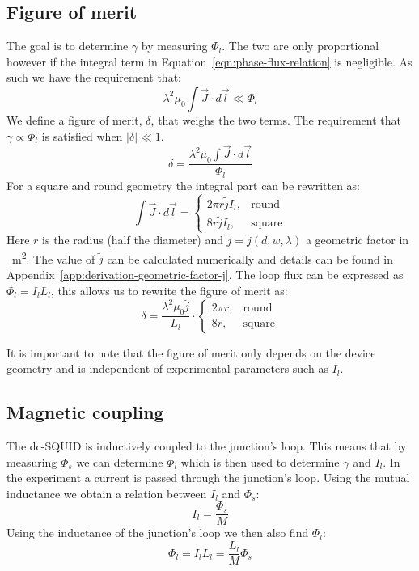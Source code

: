 \subsection{Figure of merit}
\label{sec:figure-of-merit}
The goal is to determine $\gamma$ by measuring $\Phi_l$. The two are only proportional however if the integral term in Equation~\ref{eqn:phase-flux-relation} is negligible. As such we have the requirement that:
\begin{equation*}
	\lambda^2\mu_0 \int \vec{J}\cdot d \vec{l} \ll \Phi_l
\end{equation*}
We define a figure of merit, $\delta$, that weighs the two terms. The requirement that $\gamma \propto \Phi_l$ is satisfied when $|\delta| \ll 1$.
\begin{equation}
	\delta = \frac{\lambda^2\mu_0 \int \vec{J}\cdot d \vec{l}}{\Phi_l}
\end{equation}
For a square and round geometry the integral part can be rewritten as:
\begin{equation}
	\int \vec{J}\cdot d \vec{l} = \begin{cases}
		2\pi r \tilde{j} I_l, &\text{round} \\
		8r \tilde{j} I_l, &\text{square}
	\end{cases}
\end{equation}
Here $r$ is the radius (half the diameter) and $\tilde{j} = \tilde{j}(d, w, \lambda)$ a geometric factor in \unit{\per\square\meter}. The value of $\tilde{j}$ can be calculated numerically and details can be found in Appendix~\ref{app:derivation-geometric-factor-j}. The loop flux can be expressed as $\Phi_l = I_lL_l$, this allows us to rewrite the figure of merit as:
\begin{equation}
	\delta = \frac{\lambda^2\mu_0\tilde{j}}{L_l} \cdot \begin{cases}
		2\pi r, &\text{round} \\
		8r, &\text{square}
	\end{cases}
	\label{eqn:figure-of-merit}
\end{equation}

It is important to note that the figure of merit only depends on the device geometry and is independent of experimental parameters such as $I_l$.

\subsection{Magnetic coupling}
\label{sec:magnetic-coupling}
The dc-SQUID is inductively coupled to the junction's loop. This means that by measuring $\Phi_s$ we can determine $\Phi_l$ which is then used to determine $\gamma$ and $I_l$. In the experiment a current is passed through the junction's loop. Using the mutual inductance we obtain a relation between $I_l$ and $\Phi_s$:
\begin{equation}
	I_l = \frac{\Phi_s}{M}
\end{equation}
Using the inductance of the junction's loop we then also find $\Phi_l$:
\begin{equation}
	\Phi_l = I_lL_l = \frac{L_l}{M}\Phi_s
\end{equation}

